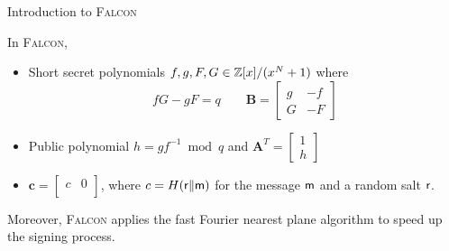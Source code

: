 %

\begin{frame}{Introduction to \textsc{Falcon}}

In \textsc{Falcon},
\pause
\begin{itemize}
    \item Short secret polynomials $f, g, F, G \in \mathbb{Z}[x] / (x^N+1)$ where
    \[
    fG - gF = q \qquad \mathbf{B} = \left[
\begin{array}{c|c}
g & -f \\ \hline G & -F
\end{array} \right]
    \]
    \pause
    \item Public polynomial $h = gf^{-1} \bmod q$ and $\mathbf{A}^T = \left[
\begin{array}{c} 1 \\ \hline h \end{array} \right]$ 
	\pause
	\item $\mathbf{c} = \left[
\begin{array}{c|c} c & 0 \\ \end{array} \right]$, where $c = H({\sf r} \| {\sf m})$ for the message $\sf m$ and a random salt $\sf r$.
\end{itemize}

\pause
Moreover, \textsc{Falcon} applies the fast Fourier nearest plane algorithm \cite{ducas2016fast} to speed up the signing process.

\end{frame}


%


